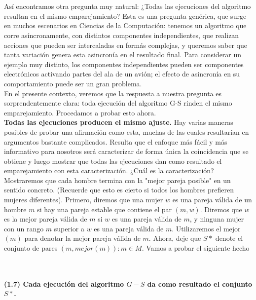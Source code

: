 \documentclass[a4paper]{article}
\begin{document}
\\
\\
Así encontramos otra pregunta muy natural: ¿Todas las ejecuciones del algoritmo resultan en el mismo emparejamiento? Esta es una pregunta genérica, que surge en muchos escenarios en Ciencias de la Computación: tenemos un algoritmo que corre asíncronamente, con distintos componentes independientes, que realizan acciones que pueden ser intercaladas en formás complejas, y queremos saber que tanta variación genera esta asincronía en el resultado final. Para considerar un ejemplo muy distinto, los componentes independientes pueden ser componentes electrónicos activando partes del ala de un avión; el efecto de asincronía en su comportamiento puede ser un gran problema.\\

En el presente contexto, veremos que la respuesta a nuestra pregunta es sorprendentemente clara: toda ejecución del algoritmo G-S rinden el mismo emparejamiento. Procedamos a probar esto ahora.\\

\textbf{Todas las ejecuciones producen el mismo ajuste.}
Hay varias maneras posibles de probar una afirmación como esta, muchas de las cuales resultarían en argumentos bastante complicados. Resulta que el enfoque más fácil y más informativo para nosotros será caracterizar de forma única la coincidencia que se obtiene y luego mostrar que todas las ejecuciones dan como resultado el emparejamiento con esta caracterización.
¿Cuál es la caracterización? Mostraremos que cada hombre termina con la "mejor pareja posible" en un sentido concreto. (Recuerde que esto es cierto si todos los hombres prefieren mujeres diferentes). Primero, diremos que una mujer $w$ es una pareja válida de un hombre $m$ si hay una pareja estable que contiene el par $(m, w)$. Diremos que $w$ es la mejor pareja válida de $m$ si $w$ es una pareja válida de $m$, y ninguna mujer con un rango $m$ superior a $w$ es una pareja válida de $m$. Utilizaremos el mejor $(m)$ para denotar la mejor pareja válida de $m$. Ahora, deje que $S*$ denote el conjunto de pares ${(m, mejor (m)): m ∈ M}$. Vamos a probar el siguiente hecho\\ \\\\
 \colorbox{mygray}{\parbox{15cm}{
\textbf{(1.7) Cada ejecución del algoritmo $G-S$ da como resultado el conjunto $S*$.}}}\\
      \\
      
\end{document}
